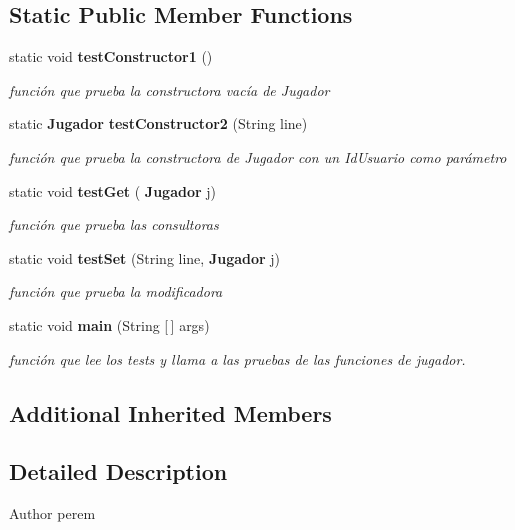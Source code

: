 \subsection*{Static Public Member Functions}
\begin{DoxyCompactItemize}
\item 
static void \textbf{ test\+Constructor1} ()
\begin{DoxyCompactList}\small\item\em función que prueba la constructora vacía de Jugador \end{DoxyCompactList}\item 
static \textbf{ Jugador} \textbf{ test\+Constructor2} (String line)
\begin{DoxyCompactList}\small\item\em función que prueba la constructora de Jugador con un Id\+Usuario como parámetro \end{DoxyCompactList}\item 
static void \textbf{ test\+Get} (\textbf{ Jugador} j)
\begin{DoxyCompactList}\small\item\em función que prueba las consultoras \end{DoxyCompactList}\item 
static void \textbf{ test\+Set} (String line, \textbf{ Jugador} j)
\begin{DoxyCompactList}\small\item\em función que prueba la modificadora \end{DoxyCompactList}\item 
static void \textbf{ main} (String [$\,$] args)
\begin{DoxyCompactList}\small\item\em función que lee los tests y llama a las pruebas de las funciones de jugador. \end{DoxyCompactList}\end{DoxyCompactItemize}
\subsection*{Additional Inherited Members}


\subsection{Detailed Description}
\begin{DoxyAuthor}{Author}
perem 
\end{DoxyAuthor}


